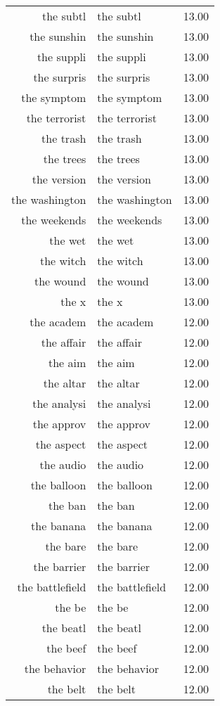 \begin{table}[ht]
\begin{tabular}{rlr}
  the subtl & the subtl & 13.00 \\ 
  the sunshin & the sunshin & 13.00 \\ 
  the suppli & the suppli & 13.00 \\ 
  the surpris & the surpris & 13.00 \\ 
  the symptom & the symptom & 13.00 \\ 
  the terrorist & the terrorist & 13.00 \\ 
  the trash & the trash & 13.00 \\ 
  the trees & the trees & 13.00 \\ 
  the version & the version & 13.00 \\ 
  the washington & the washington & 13.00 \\ 
  the weekends & the weekends & 13.00 \\ 
  the wet & the wet & 13.00 \\ 
  the witch & the witch & 13.00 \\ 
  the wound & the wound & 13.00 \\ 
  the x & the x & 13.00 \\ 
  the academ & the academ & 12.00 \\ 
  the affair & the affair & 12.00 \\ 
  the aim & the aim & 12.00 \\ 
  the altar & the altar & 12.00 \\ 
  the analysi & the analysi & 12.00 \\ 
  the approv & the approv & 12.00 \\ 
  the aspect & the aspect & 12.00 \\ 
  the audio & the audio & 12.00 \\ 
  the balloon & the balloon & 12.00 \\ 
  the ban & the ban & 12.00 \\ 
  the banana & the banana & 12.00 \\ 
  the bare & the bare & 12.00 \\ 
  the barrier & the barrier & 12.00 \\ 
  the battlefield & the battlefield & 12.00 \\ 
  the be & the be & 12.00 \\ 
  the beatl & the beatl & 12.00 \\ 
  the beef & the beef & 12.00 \\ 
  the behavior & the behavior & 12.00 \\ 
  the belt & the belt & 12.00 \\ 

\end{tabular}
\end{table}
